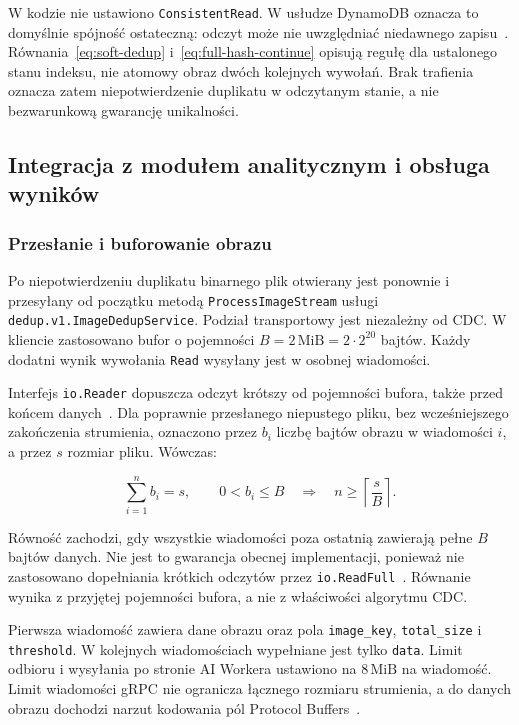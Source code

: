 W kodzie nie ustawiono \texttt{ConsistentRead}.
W usłudze DynamoDB oznacza to domyślnie spójność ostateczną:
odczyt może nie uwzględniać niedawnego zapisu~\cite{aws_read_consistency}.
Równania~\eqref{eq:soft-dedup} i~\eqref{eq:full-hash-continue}
opisują regułę dla ustalonego stanu indeksu, nie atomowy obraz
dwóch kolejnych wywołań.
Brak trafienia oznacza zatem niepotwierdzenie duplikatu
w odczytanym stanie, a nie bezwarunkową gwarancję unikalności.

\subsection{Integracja z modułem analitycznym i obsługa wyników}
\label{subsec:similarity-grpc-pipeline}

\subsubsection{Przesłanie i buforowanie obrazu}

Po niepotwierdzeniu duplikatu binarnego plik otwierany jest ponownie
i przesyłany od początku metodą \texttt{ProcessImageStream}
usługi \texttt{dedup.v1.ImageDedupService}.
Podział transportowy jest niezależny od CDC.
W kliencie zastosowano bufor o pojemności
\(B=2\,\mathrm{MiB}=2\cdot2^{20}\) bajtów.
Każdy dodatni wynik wywołania \texttt{Read} wysyłany jest
w osobnej wiadomości.

Interfejs \texttt{io.Reader} dopuszcza odczyt krótszy od pojemności
bufora, także przed końcem danych~\cite{go_io_reader}.
Dla poprawnie przesłanego niepustego pliku, bez wcześniejszego
zakończenia strumienia, oznaczono przez \(b_i\) liczbę bajtów obrazu
w wiadomości \(i\), a przez \(s\) rozmiar pliku.
Wówczas:

\begin{equation}
\label{eq:message-count}
\sum_{i=1}^{n}b_i=s,\qquad
0<b_i\leq B
\quad\Longrightarrow\quad
n\geq\left\lceil\frac{s}{B}\right\rceil.
\end{equation}

Równość zachodzi, gdy wszystkie wiadomości poza ostatnią zawierają
pełne \(B\) bajtów danych. Nie jest to gwarancja obecnej implementacji,
ponieważ nie zastosowano dopełniania krótkich odczytów przez
\texttt{io.ReadFull}~\cite{go_io_reader}.
Równanie wynika z przyjętej pojemności bufora, a nie z właściwości
algorytmu CDC.

Pierwsza wiadomość zawiera dane obrazu oraz pola
\texttt{image\_key}, \texttt{total\_size} i \texttt{threshold}.
W kolejnych wiadomościach wypełniane jest tylko \texttt{data}.
Limit odbioru i wysyłania po stronie AI Workera ustawiono na
\(8\,\mathrm{MiB}\) na wiadomość.
Limit wiadomości gRPC nie ogranicza łącznego rozmiaru strumienia,
a do danych obrazu dochodzi narzut kodowania pól
Protocol Buffers~\cite{grpc_core_limits,protobuf_encoding}.

